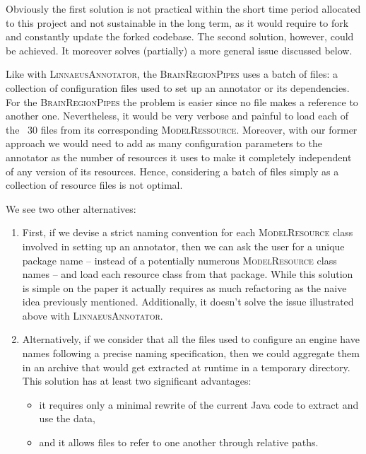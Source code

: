 \documentclass{article}
\newcommand{\id}[1]{\mbox{\textsc{#1}}}
\begin{document}
Obviously the first solution is not practical within the short time period allocated to this project and not sustainable in the long term, as it would require to fork and constantly update the forked codebase. The second solution, however, could be achieved. It moreover solves (partially) a more general issue discussed below.

Like with \id{LinnaeusAnnotator}, the \id{BrainRegionPipes} uses a batch of files: a collection of configuration files used to set up an annotator or its dependencies. For the \id{BrainRegionPipes} the problem is easier since no file makes a reference to another one. Nevertheless, it would be very verbose and painful to load each of the ~30 files from its corresponding \id{ModelRessource}. Moreover, with our former approach we would need to add as many configuration parameters to the annotator as the number of resources it uses to make it completely independent of any version of its resources. Hence, considering a batch of files simply as a collection of resource files is not optimal.

We see two other alternatives:

\begin{enumerate}

\item First, if we devise a strict naming convention for each \id{ModelResource} class involved in setting up an annotator, then we can ask the user for a unique package name -- instead of a potentially numerous \id{ModelResource} class names -- and load each resource class from that package. While this solution is simple on the paper it actually requires as much refactoring as the naive idea previously mentioned. Additionally, it doesn't solve the issue illustrated above with \id{LinnaeusAnnotator}.

\item Alternatively, if we consider that all the files used to configure an engine have names following a precise naming specification, then we could aggregate them in an archive that would get extracted at runtime in a temporary directory. This solution has at least two significant advantages:

\begin{itemize}

\item it requires only a minimal rewrite of the current Java code to extract and use the data,

\item and it allows files to refer to one another through relative paths.

\end{itemize}

\end{enumerate}
\end{document}
